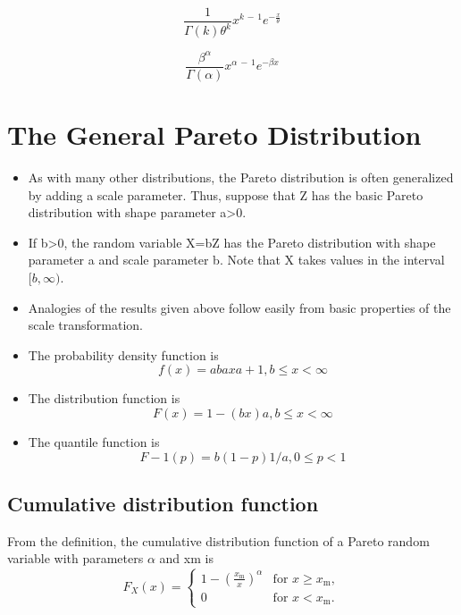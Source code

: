 \documentclass[]{report}
\begin{document}
\[{\frac {1}{\Gamma (k)\theta ^{k}}}x^{k\,-\,1}e^{-{\frac {x}{\theta }}}\]

\[{\frac {\beta ^{\alpha }}{\Gamma (\alpha )}}x^{\alpha \,-\,1}e^{-\beta x}\]
\newpage

\section{The General Pareto Distribution}

\begin{itemize}
\item As with many other distributions, the Pareto distribution is often generalized by adding a scale parameter. Thus, suppose that Z has the basic Pareto distribution with shape parameter a>0.
\item If b>0, the random variable X=bZ has the Pareto distribution with shape parameter a and scale parameter b. Note that X takes values in the interval $[b, \infty)$.

\item Analogies of the results given above follow easily from basic properties of the scale transformation.

\end{itemize}



\begin{itemize}
\item The probability density function is
\[ f(x)=abaxa+1,b\leq x< \infty \]
\item The distribution function is
\[F(x)=1-(bx)a,b\leq x< \infty \]


\item The quantile function is
\[F-1(p)=b(1-p)1/a,0\leq p<1\]
\end{itemize}


\subsection{Cumulative distribution function}
From the definition, the cumulative distribution function of a Pareto random variable with parameters $\alpha$ and xm is
\[F_X(x) = \begin{cases}
1-\left(\frac{x_\mathrm{m}}{x}\right)^\alpha & \mbox{for } x \ge x_\mathrm{m}, \\
0 & \mbox{for }x < x_\mathrm{m}.
\end{cases}
\]
\end{document}
